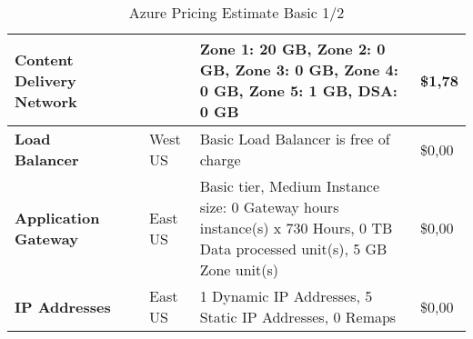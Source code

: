 \begin{landscape}
\begin{table}[]
\begin{tabularx}{\linewidth}{|l|X|X|X|X|}
\textbf{Content Delivery Network} &                           &                 & Zone 1: 20 GB, Zone 2: 0 GB, Zone 3: 0 GB, Zone 4: 0 GB, Zone 5: 1 GB, DSA: 0 GB                                                                                                                                                                 & \$1,78                                   \\ \hline
\textbf{Load Balancer}            &                           & West US         & Basic Load Balancer is free of charge                                                                                                                                                                                                            & \$0,00                                   \\ \hline
\textbf{Application Gateway}      &                           & East US         & Basic tier, Medium Instance size: 0 Gateway hours instance(s) x 730 Hours, 0 TB Data processed unit(s), 5 GB Zone unit(s)                                                                                                                        & \$0,00                                   \\ \hline
\textbf{IP Addresses}             &                           & East US         & 1 Dynamic IP Addresses, 5 Static IP Addresses, 0 Remaps                                                                                                                                                                                          & \$0,00                                   \\ \hline
\end{tabularx}
\caption{Azure Pricing Estimate Basic 1/2}
\label{azPriceT1_1}
\end{table}
\end{landscape}